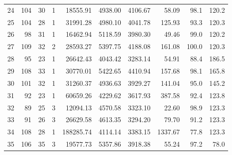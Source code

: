\begin{longtable}{rrrrrrrrrr}
24 & 104 & 30 & 1 & 18555.91 & 4938.00 & 4106.67 & 58.09 & 98.1 & 120.2 \\
25 & 104 & 28 & 1 & 31991.28 & 4980.10 & 4041.78 & 125.93 & 93.3 & 120.3 \\
26 & 98 & 31 & 1 & 16462.94 & 5118.59 & 3980.30 & 49.46 & 99.0 & 120.2 \\
27 & 109 & 32 & 2 & 28593.27 & 5397.75 & 4188.08 & 161.08 & 100.0 & 120.3 \\
28 & 95 & 23 & 1 & 26642.43 & 4043.42 & 3283.14 & 54.91 & 88.4 & 186.5 \\
29 & 108 & 33 & 1 & 30770.01 & 5422.65 & 4410.94 & 157.68 & 98.1 & 165.8 \\
30 & 101 & 32 & 1 & 31260.37 & 4936.63 & 3929.27 & 141.04 & 95.0 & 145.2 \\
31 & 92 & 23 & 1 & 60659.26 & 4229.62 & 3617.93 & 387.58 & 92.4 & 123.8 \\
32 & 89 & 25 & 3 & 12094.13 & 4570.58 & 3323.10 & 22.60 & 98.9 & 123.3 \\
33 & 91 & 26 & 3 & 26629.58 & 4613.35 & 3294.20 & 79.70 & 91.2 & 123.3 \\
34 & 108 & 28 & 1 & 188285.74 & 4114.14 & 3383.15 & 1337.67 & 77.8 & 123.3 \\
35 & 106 & 35 & 3 & 19577.73 & 5357.86 & 3918.38 & 55.24 & 97.2 & 78.0 \\

\end{longtable}

\endgroup
